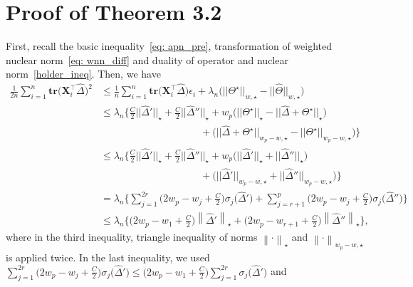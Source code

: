 \documentclass[12pt]{article}
\begin{document}
\section{Proof of Theorem 3.2}
First, recall the basic inequality~\eqref{eq: apn_pre}, transformation of weighted nuclear norm~\eqref{eq: wnn_diff} and duality of operator and nuclear norm~\eqref{holder_ineq}.
Then, we have
\begin{align}
    \frac{1}{2n}\sum^{n}_{i=1} \textbf{tr}(\mathbf{X}_{i}^{\top}\widehat{\Delta}\big)^{2} 
    &\leq \frac{1}{n} \sum^{n}_{i=1} \textbf{tr}\big(\mathbf{X}_{i}^{\top}\widehat{\Delta}\big) \epsilon_{i} + 
    \lambda_{n} \big( ||\Theta^{\star}||_{w,\star} - ||\widehat{\Theta}||_{w,\star} \big) \nonumber \\
    &\leq \lambda_{n}\bigg\{ \frac{C}{2}||\widehat{\Delta}'||_{\star} 
    + \frac{C}{2}||\widehat{\Delta}''||_{\star}
    + w_{p}\big( ||\Theta^{\star}||_{\star} - ||\widehat{\Delta}  + \Theta^{\star}||_{\star} \big) \nonumber \\
    &\qquad \qquad \qquad \qquad \qquad + \big( ||\widehat{\Delta} + \Theta^{\star}||_{w_{p}-w,\star} - ||\Theta^{\star}||_{w_{p}-w,\star}\big)\bigg\} \nonumber \\
    &\leq \lambda_{n}\bigg\{ \frac{C}{2}||\widehat{\Delta}'||_{\star} 
    + \frac{C}{2}||\widehat{\Delta}''||_{\star}
    + w_{p}\big( ||\widehat{\Delta}'||_{\star} + ||\widehat{\Delta}''||_{\star} \big) \nonumber \\
    &\qquad \qquad \qquad \qquad \qquad + \big( ||\widehat{\Delta}'||_{w_{p}-w,\star} + ||\widehat{\Delta}''||_{w_{p}-w,\star}\big)\bigg\} \nonumber \\
    &=\lambda_{n}\bigg\{ \sum_{j=1}^{2r}\bigg(2w_{p}-w_{j}+\frac{C}{2}\bigg)\sigma_{j}\big(\widehat{\Delta}'\big) + \sum_{j=r+1}^{p}\bigg(2w_{p}-w_{j}+\frac{C}{2}\bigg)\sigma_{j}\big(\widehat{\Delta}''\big)\bigg\} \nonumber \\
    &\leq \lambda_{n}\bigg\{ \bigg( 2w_{p}-w_{1}+\frac{C}{2} \bigg)
    \left\|\widehat{\Delta}'\right\|_{\star} + 
    \bigg( 2w_{p}-w_{r+1}+\frac{C}{2} \bigg)
    \left\|\widehat{\Delta}'' \right\|_{\star}\bigg\},  \label{eq: basic}
\end{align}
where in the third inequality, triangle inequality of norms $\left\| \cdot \right\|_{\star}$ and $\left\| \cdot \right\|_{w_{p}-w,\star}$ is applied twice.
In the last inequality, we used 
$\sum_{j=1}^{2r}\big(2w_{p}-w_{j}+\frac{C}{2}\big)\sigma_{j}\big(\widehat{\Delta}'\big)\leq \big(2w_{p}-w_{1}+\frac{C}{2}\big) \sum_{j=1}^{2r}\sigma_{j}\big(\widehat{\Delta}'\big)$ and 
\end{document}
